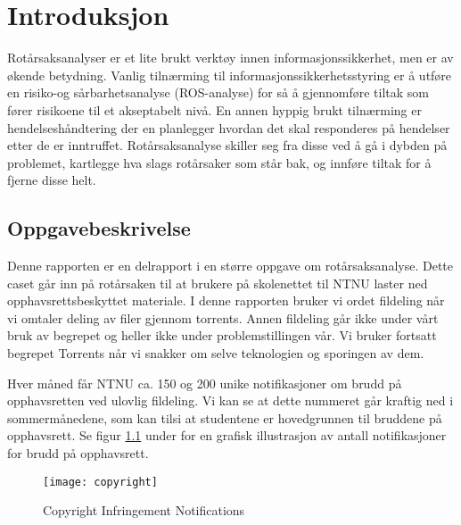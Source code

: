 \chapter{Introduksjon}
Rotårsaksanalyser er et lite brukt verktøy innen informasjonssikkerhet, men er av økende betydning. Vanlig tilnærming til informasjonssikkerhetsstyring er å utføre en risiko-og sårbarhetsanalyse (ROS-analyse) for så å gjennomføre tiltak som fører risikoene til et akseptabelt nivå. En annen hyppig brukt tilnærming er hendelseshåndtering der en planlegger hvordan det skal responderes på hendelser etter de er inntruffet. Rotårsaksanalyse skiller seg fra disse ved å gå i dybden på problemet, kartlegge hva slags rotårsaker som står bak, og innføre tiltak for å fjerne disse helt.

\section{Oppgavebeskrivelse}
Denne rapporten er en delrapport i en større oppgave om rotårsaksanalyse. Dette caset går inn på rotårsaken til at brukere på skolenettet til NTNU laster ned opphavsrettsbeskyttet materiale. I denne rapporten bruker vi ordet fildeling når vi omtaler deling av filer gjennom torrents. Annen fildeling går ikke under vårt bruk av begrepet og heller ikke under problemstillingen vår. Vi bruker fortsatt begrepet Torrents når vi snakker om selve teknologien og sporingen av dem.

Hver måned får NTNU ca. 150 og 200 unike notifikasjoner om brudd på opphavsretten ved ulovlig fildeling. Vi kan se at dette nummeret går kraftig ned i sommermånedene, som kan tilsi at studentene er hovedgrunnen til bruddene på opphavsrett. Se figur \ref{fig:copyright} under for en grafisk illustrasjon av antall notifikasjoner for brudd på opphavsrett.

\begin{figure}[H]
    \centering
    \texttt{[image: copyright]}
    \label{fig:copyright}
    \caption[Copyright Infringement Notifications]{Copyright Infringement Notifications}
\end{figure}

\begin{comment}
\begin{table} [h]
    \begin{tabular}{ | m{12em} | m{12em} | m{12em} | }
        \hline
            \cellcolor{yellow} & \cellcolor{yellow} Breaches & \cellcolor{yellow} Copyright breach/Piracy\\
        \hline
            Policy Violation & Information Security Policy & 2 \\
        \hline
             & IT Policy & 43 \\
        \hline
    \end{tabular}
    \caption{Oversikt over kvantiteten av brudd på policy}
    \label{kritisk_tabell_1}
\end{table}
\end{comment}

